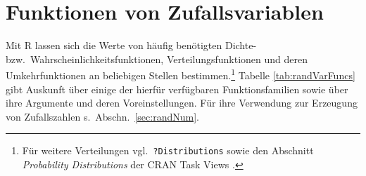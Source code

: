 \section{Funktionen von Zufallsvariablen}
\label{sec:randVarFuncs}

Mit R lassen sich die Werte von häufig benötigten Dichte- bzw.\ Wahrscheinlichkeitsfunktionen, Verteilungsfunktionen und deren Umkehrfunktionen an beliebigen Stellen bestimmen.\footnote{Für weitere Verteilungen vgl.\ \lstinline!?Distributions! sowie den Abschnitt \emph{Probability Distributions} der CRAN Task Views \cite{CRANtvProbDistr}.} Tabelle \ref{tab:randVarFuncs} gibt Auskunft über einige der hierfür verfügbaren Funktionsfamilien sowie über ihre Argumente und deren Voreinstellungen. Für ihre Verwendung zur Erzeugung von Zufallszahlen s.\ Abschn.\ \ref{sec:randNum}.

